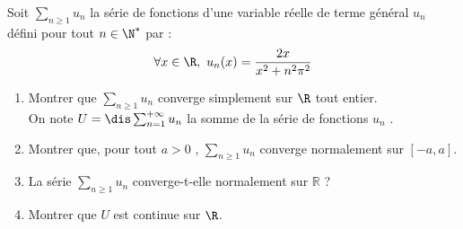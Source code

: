 \documentclass[a4paper,10pt]{report}
\newcommand{\Sum}[2]{\ensuremath{\textstyle{\sum\limits_{#1}^{#2}}}}
\begin{document}
\begin{Exa}  Soit $\Sum{n \geq 1}{} u_n$ la s\'erie de fonctions d'une variable r\'eelle de terme g\'en\'eral $u_n$ d\'efini pour tout $n \in \N^*$ par : 
$$ \forall x \in \R ,\ u_n(x)=\dfrac{2x}{x^2+n^2\pi^2}$$
\begin{enumerate}
\item Montrer que $\Sum{n \geq 1}{} u_n$ converge simplement sur $\R$ tout entier.\\

\noindent On note $U=\dis \sum_{n=1}^{+\infty}{u_n}$ la somme de la s\'erie de fonctions $u_n$ .
\item Montrer que, pour tout $a > 0$ , $\Sum{n \geq 1}{} u_n$ converge normalement sur $[-a,a]$.
\item La s\'erie $\Sum{n \geq 1}{} u_n$ converge-t-elle normalement sur $\mathbb{R}$ ?
\item Montrer que $U$ est continue sur $\R$.
\end{enumerate}
\end{Exa}
\end{document}
